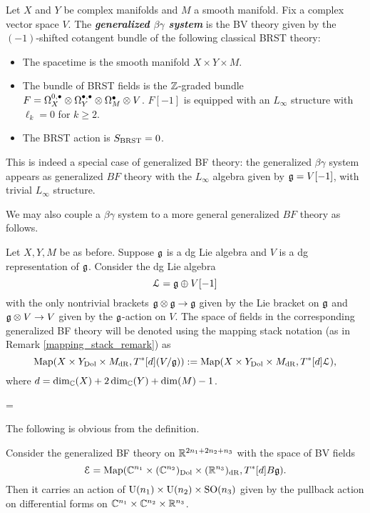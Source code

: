 \documentclass[10pt, oneside]{article}
\renewcommand{\U}{\mathrm{U}}
\newcommand{\defterm}[1]{\textbf{\emph{#1}}}
\begin{document}
\begin{definition}
Let $X$ and $Y$ be complex manifolds and $M$ a smooth manifold. Fix a complex vector space $V$. The \defterm{generalized $\beta\gamma$ system} is the BV theory given by the $(-1)$-shifted cotangent bundle of the following classical BRST theory:
\begin{itemize}
\item The spacetime is the smooth manifold $X\times Y\times M$.

\item The bundle of BRST fields is the $\mathbb Z$-graded bundle $F = \Omega^{0,\bullet}_X \otimes \Omega^{\bullet,\bullet}_Y \otimes \Omega^\bullet_M \otimes V$. $F[-1]$ is equipped with an $L_\infty$ structure with $\ell_{k} = 0$ for $k \geq 2$. 

\item The BRST action is $S_{\mathrm{BRST}} = 0$.
\end{itemize}
\end{definition}

\begin{remark}
This is indeed a special case of generalized BF theory: the generalized $\beta\gamma$ system appears as generalized $BF$ theory with the $L_\infty$ algebra given by $\mathfrak g = V[-1]$, with trivial $L_\infty$ structure. 
\end{remark}

We may also couple a $\beta\gamma$ system to a more general generalized $BF$ theory as follows.

\begin{example}
Let $X,Y,M$ be as before. Suppose $\mathfrak g$ is a dg Lie algebra and $V$ is a dg representation of $\mathfrak g$. Consider the dg Lie algebra
\[\mathcal L = \mathfrak g\oplus V[-1]\]
with the only nontrivial brackets $\mathfrak g\otimes \mathfrak g\rightarrow \mathfrak g$ given by the Lie bracket on $\mathfrak g$ and $\mathfrak g\otimes V\rightarrow V$ given by the $\mathfrak g$-action on $V$. The space of fields in the corresponding generalized BF theory will be denoted using the mapping stack notation (as in Remark \ref{mapping_stack_remark}) as
\[\operatorname{Map}(X\times Y_{\mathrm{Dol}}\times M_{\mathrm{dR}}, T^*[d] (V / \mathfrak g)):=\operatorname{Map}(X\times Y_{\mathrm{Dol}}\times M_{\mathrm{dR}}, T^*[d] \mathcal L),\]
where $d = \dim_\mathbb C(X) + 2\dim_\mathbb C(Y) + \dim(M) - 1$.
\end{example}=

The following is obvious from the definition.

\begin{prop}
Consider the generalized BF theory on $\mathbb R^{2n_1+2n_2+n_3}$ with the space of BV fields
\[\mathcal E = \operatorname{Map}(\mathbb C^{n_1}\times (\mathbb C^{n_2})_{\mathrm{Dol}}\times (\mathbb R^{n_3})_{\mathrm{dR}}, T^*[d] B\mathfrak g).\]
Then it carries an action of $\U(n_1)\times \U(n_2)\times \SO(n_3)$ given by the pullback action on differential forms on $\mathbb C^{n_1}\times \mathbb C^{n_2}\times \mathbb R^{n_3}$.
\label{prop:BFrotationaction}
\end{prop}
\end{document}
